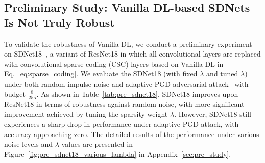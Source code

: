\subsection{Preliminary Study: Vanilla DL-based SDNets Is Not Truly Robust} 

To validate the robustness of Vanilla DL, 
we conduct a preliminary experiment on SDNet18~\cite{li2022revisiting}, a variant of ResNet18 in which all convolutional layers are replaced with convolutional sparse coding (CSC) layers based on Vanilla DL in Eq.~\eqref{eq:sparse_coding}.
We evaluate the SDNet18 (with fixed $\lambda$ and tuned $\lambda$) under both random impulse noise
and adaptive PGD adversarial attack~\cite{madry2017towards} with budget $\frac{8}{255}$. 
As shown in Table~\ref{tab:pre_sdnet18}, 
SDNet18 improves upon ResNet18 in terms of robustness against random noise, with more significant improvement achieved by tuning the sparsity weight $\lambda$.
However, SDNet18 still experiences a sharp drop in performance under adaptive PGD attack, with accuracy approaching zero. The detailed results of the performance under various noise levels and $\lambda$ values are presented in Figure~\ref{fig:pre_sdnet18_various_lambda} in Appendix~\ref{sec:pre_study}.






